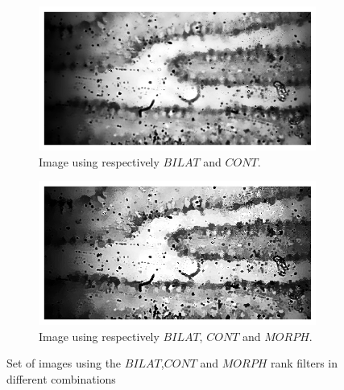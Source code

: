 \begin{figure}[h!]
    \begin{subfigure}[b]{0.4\textwidth}
        \centering
        \includegraphics[width=\textwidth, frame]{afbeeldingen/rank/img_cont_bilat.png}
        \caption{Image using respectively $BILAT$ and $CONT$.}   
        \label{fig_rank_cont_bilat}
    \end{subfigure}
    \hspace*{\fill}
    \begin{subfigure}[b]{0.4\textwidth}
        \centering
        \includegraphics[width=\textwidth, frame]{afbeeldingen/rank/img_morph_cont_bilat.png}
        \caption{Image using respectively $BILAT$, $CONT$ and $MORPH$.}   
        \label{fig_rank_morph_cont_bilat}
    \end{subfigure}
    
    \caption{Set of images using the $BILAT$,$CONT$ and $MORPH$ rank filters in different combinations} 
	\label{fig_rank}
\end{figure}

